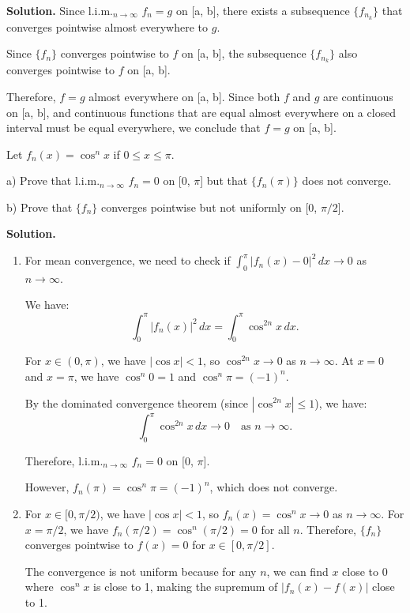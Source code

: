 \noindent\textbf{Solution.} Since l.i.m.\(_{n\to\infty}\) \( f_n = g \) on [a, b], there exists a subsequence \( \{f_{n_k}\} \) that converges pointwise almost everywhere to \( g \).

Since \( \{f_n\} \) converges pointwise to \( f \) on [a, b], the subsequence \( \{f_{n_k}\} \) also converges pointwise to \( f \) on [a, b].

Therefore, \( f = g \) almost everywhere on [a, b]. Since both \( f \) and \( g \) are continuous on [a, b], and continuous functions that are equal almost everywhere on a closed interval must be equal everywhere, we conclude that \( f = g \) on [a, b].

\begin{problembox}
Let \( f_n(x) = \cos^n x \) if \( 0 \leq x \leq \pi \).

a) Prove that l.i.m.\(_{n\to\infty}\) \( f_n = 0 \) on [0, \(\pi\)] but that \( \{f_n(\pi)\} \) does not converge.

b) Prove that \( \{f_n\} \) converges pointwise but not uniformly on [0, \(\pi/2\)].
\end{problembox}

\noindent\textbf{Solution.}
\begin{enumerate}[label=(\alph*)]
\item For mean convergence, we need to check if \( \int_0^\pi |f_n(x) - 0|^2 \, dx \to 0 \) as \( n \to \infty \).

We have:
\[\int_0^\pi |f_n(x)|^2 \, dx = \int_0^\pi \cos^{2n} x \, dx.\]

For \( x \in (0, \pi) \), we have \( |\cos x| < 1 \), so \( \cos^{2n} x \to 0 \) as \( n \to \infty \). At \( x = 0 \) and \( x = \pi \), we have \( \cos^n 0 = 1 \) and \( \cos^n \pi = (-1)^n \).

By the dominated convergence theorem (since \( |\cos^{2n} x| \leq 1 \)), we have:
\[\int_0^\pi \cos^{2n} x \, dx \to 0 \quad \text{as } n \to \infty.\]

Therefore, l.i.m.\(_{n\to\infty}\) \( f_n = 0 \) on [0, \(\pi\)].

However, \( f_n(\pi) = \cos^n \pi = (-1)^n \), which does not converge.

\item For \( x \in [0, \pi/2) \), we have \( |\cos x| < 1 \), so \( f_n(x) = \cos^n x \to 0 \) as \( n \to \infty \). For \( x = \pi/2 \), we have \( f_n(\pi/2) = \cos^n(\pi/2) = 0 \) for all \( n \). Therefore, \( \{f_n\} \) converges pointwise to \( f(x) = 0 \) for \( x \in [0, \pi/2] \).

The convergence is not uniform because for any \( n \), we can find \( x \) close to 0 where \( \cos^n x \) is close to 1, making the supremum of \( |f_n(x) - f(x)| \) close to 1.
\end{enumerate}

